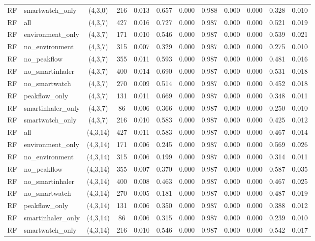 \begin{longtable}{llcccccccccc}
RF & smartwatch\_only & (4,3,0) & 216 & 0.013 & 0.657 & 0.000 & 0.988 & 0.000 & 0.000 & 0.328 & 0.010 \\
RF & all & (4,3,7) & 427 & 0.016 & 0.727 & 0.000 & 0.987 & 0.000 & 0.000 & 0.521 & 0.019 \\
RF & environment\_only & (4,3,7) & 171 & 0.010 & 0.546 & 0.000 & 0.987 & 0.000 & 0.000 & 0.539 & 0.021 \\
RF & no\_environment & (4,3,7) & 315 & 0.007 & 0.329 & 0.000 & 0.987 & 0.000 & 0.000 & 0.275 & 0.010 \\
RF & no\_peakflow & (4,3,7) & 355 & 0.011 & 0.593 & 0.000 & 0.987 & 0.000 & 0.000 & 0.481 & 0.016 \\
RF & no\_smartinhaler & (4,3,7) & 400 & 0.014 & 0.690 & 0.000 & 0.987 & 0.000 & 0.000 & 0.531 & 0.018 \\
RF & no\_smartwatch & (4,3,7) & 270 & 0.009 & 0.514 & 0.000 & 0.987 & 0.000 & 0.000 & 0.452 & 0.018 \\
RF & peakflow\_only & (4,3,7) & 131 & 0.011 & 0.669 & 0.000 & 0.987 & 0.000 & 0.000 & 0.348 & 0.011 \\
RF & smartinhaler\_only & (4,3,7) & 86 & 0.006 & 0.366 & 0.000 & 0.987 & 0.000 & 0.000 & 0.250 & 0.010 \\
RF & smartwatch\_only & (4,3,7) & 216 & 0.010 & 0.583 & 0.000 & 0.987 & 0.000 & 0.000 & 0.425 & 0.012 \\
RF & all & (4,3,14) & 427 & 0.011 & 0.583 & 0.000 & 0.987 & 0.000 & 0.000 & 0.467 & 0.014 \\
RF & environment\_only & (4,3,14) & 171 & 0.006 & 0.245 & 0.000 & 0.987 & 0.000 & 0.000 & 0.569 & 0.026 \\
RF & no\_environment & (4,3,14) & 315 & 0.006 & 0.199 & 0.000 & 0.987 & 0.000 & 0.000 & 0.314 & 0.011 \\
RF & no\_peakflow & (4,3,14) & 355 & 0.007 & 0.370 & 0.000 & 0.987 & 0.000 & 0.000 & 0.587 & 0.035 \\
RF & no\_smartinhaler & (4,3,14) & 400 & 0.008 & 0.463 & 0.000 & 0.987 & 0.000 & 0.000 & 0.467 & 0.025 \\
RF & no\_smartwatch & (4,3,14) & 270 & 0.005 & 0.181 & 0.000 & 0.987 & 0.000 & 0.000 & 0.487 & 0.019 \\
RF & peakflow\_only & (4,3,14) & 131 & 0.006 & 0.350 & 0.000 & 0.987 & 0.000 & 0.000 & 0.388 & 0.012 \\
RF & smartinhaler\_only & (4,3,14) & 86 & 0.006 & 0.315 & 0.000 & 0.987 & 0.000 & 0.000 & 0.239 & 0.010 \\
RF & smartwatch\_only & (4,3,14) & 216 & 0.010 & 0.546 & 0.000 & 0.987 & 0.000 & 0.000 & 0.542 & 0.017 \\

\end{longtable}
